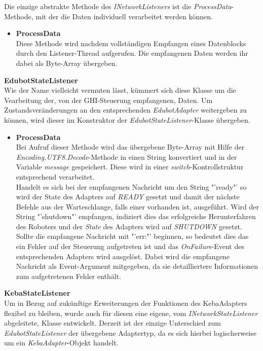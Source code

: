Die einzige abstrakte Methode des  \textit{INetworkListeners} ist die \textit{ProcessData}-Methode, mit der die Daten individuell verarbeitet werden können.
\begin{itemize}
\item \textbf{ProcessData}\\
Diese Methode wird nachdem vollständigen Empfangen eines Datenblocks durch den Listener-Thread aufgerufen. Die empfangenen Daten werden ihr dabei als Byte-Array übergeben.
\end{itemize}
\textbf{EdubotStateListener}\\
Wie der Name vielleicht vermuten lässt, kümmert sich diese Klasse um die Vearbeitung der, von der GHI-Steuerung empfangenen, Daten. Um Zustandsveränderungen an den entsprechenden \textit{EdubotAdapter} weitergeben zu können, wird dieser im Konstruktor der \textit{EdubotStateListener}-Klasse übergeben.
\begin{itemize}
\item \textbf{ProcessData}\\
Bei Aufruf dieser Methode wird das übergebene Byte-Array mit Hilfe der \textit{Encoding.UTF8.Decode}-Methode in einen String konvertiert und in der Variable \textit{message} gespeichert. Diese wird in einer  \textit{switch}-Kontrollstruktur entsprechend verarbeitet.\\
Handelt es sich bei der empfangenen Nachricht um den String "'ready"' so wird der State des Adapters auf \textit{READY} gesetzt und damit der nächste Befehle aus der Warteschlange, falls einer vorhanden ist, ausgeführt.
Wird der String "'shutdown"' empfangen, indiziert dies das erfolgreiche Herunterfahren des Roboters und der \textit{State} des Adapters wird auf \textit{SHUTDOWN} gesetzt. Sollte die empfangene Nachricht mit "'err:"' beginnen, so bedeutet dies das ein Fehler auf der Steuerung aufgetreten ist und das \textit{OnFailure}-Event des entsprechenden Adapters wird ausgelöst. Dabei wird die empfangene Nachricht als Event-Argument mitgegeben, da sie detailliertere Informationen zum aufgetretenen Fehler enthält.
\end{itemize}
\textbf{KebaStateListener}\\
Um in Bezug auf zukünftige Erweiterungen der Funktionen des KebaAdapters flexibel zu bleiben, wurde auch für diesen eine eigene, vom  \textit{INetworkStateListener} abgeleitete, Klasse entwickelt. Derzeit ist der einzige Unterschied zum  \textit{EdubotStateListener} der übergebene Adaptertyp, da es sich hierbei logischerweise um ein  \textit{KebaAdapter}-Objekt handelt.
